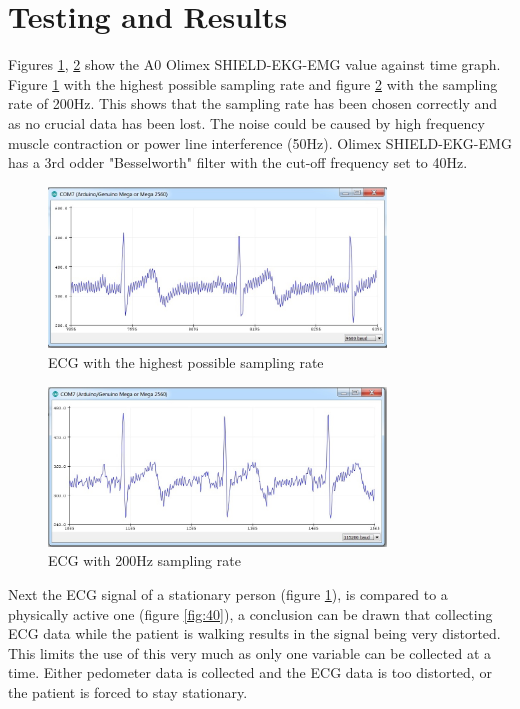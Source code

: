 \documentclass[12pt,]{article}
\numberwithin{figure}{section}
\begin{document}
\section{Testing and Results}
Figures \ref{fig:27}, \ref{fig:39} show the A0 Olimex SHIELD-EKG-EMG value against time graph. Figure \ref{fig:27} with the highest possible sampling rate and figure \ref{fig:39} with the sampling rate of 200Hz. This shows that the sampling rate has been chosen correctly and as no crucial data has been lost. The noise could be caused by high frequency muscle contraction or power line interference (50Hz). Olimex SHIELD-EKG-EMG has a 3rd odder "Besselworth" filter with the cut-off frequency  set to 40Hz.
\begin{figure}[H]
	\begin{center}
		\includegraphics[width=0.8\textwidth]{26}
	\end{center}
    \caption{ECG with the highest possible sampling rate}
	\label{fig:27}
\end{figure}
\begin{figure}[H]
	\begin{center}
		\includegraphics[width=0.8\textwidth]{27}
	\end{center}
    \caption{ECG with 200Hz sampling rate}
	\label{fig:39}
\end{figure}
Next the ECG signal of a stationary person (figure \ref{fig:27}), is compared to a physically active one (figure \ref{fig:40}), a conclusion can be drawn that collecting ECG data while the patient is walking results in the signal being very distorted. This limits the use of this very much as only one variable can be collected at a time. Either pedometer data is collected and the ECG data is too distorted, or the patient is forced to stay stationary.
\end{document}
